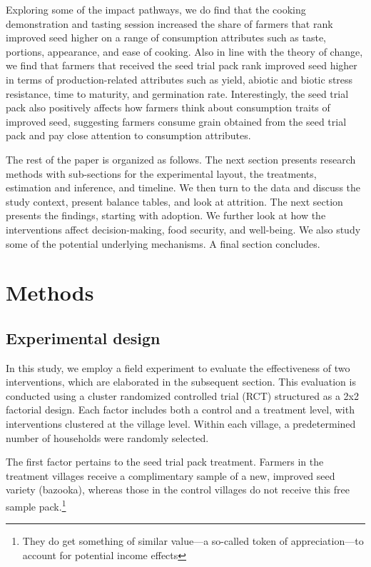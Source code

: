 \documentclass[english]{article}\usepackage[]{graphicx}\usepackage[]{xcolor}
\begin{document}
Exploring some of the impact pathways, we do find that the cooking
demonstration and tasting session increased the share of farmers that
rank improved seed higher on a range of consumption attributes such
as taste, portions, appearance, and ease of cooking. Also in line
with the theory of change, we find that farmers that received the
seed trial pack rank improved seed higher in terms of production-related
attributes such as yield, abiotic and biotic stress resistance, time
to maturity, and germination rate. Interestingly, the seed trial pack
also positively affects how farmers think about consumption traits
of improved seed, suggesting farmers consume grain obtained from the
seed trial pack and pay close attention to consumption attributes.

The rest of the paper is organized as follows. The next section presents
research methods with sub-sections for the experimental layout, the
treatments, estimation and inference, and timeline. We then turn to
the data and discuss the study context, present balance tables, and
look at attrition. The next section presents the findings, starting
with adoption. We further look at how the interventions affect decision-making,
food security, and well-being. We also study some of the potential
underlying mechanisms. A final section concludes.

\section{Methods }

\subsection{Experimental design}

In this study, we employ a field experiment to evaluate the effectiveness
of two interventions, which are elaborated in the subsequent section.
This evaluation is conducted using a cluster randomized controlled
trial (RCT) structured as a 2x2 factorial design. Each factor includes
both a control and a treatment level, with interventions clustered
at the village level. Within each village, a predetermined number
of households were randomly selected.

The first factor pertains to the seed trial pack treatment. Farmers
in the treatment villages receive a complimentary sample of a new,
improved seed variety (bazooka), whereas those in the control villages
do not receive this free sample pack.\footnote{They do get something of similar value---a so-called token of appreciation---to
account for potential income effects} 
\end{document}
